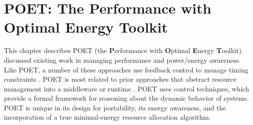 \chapter{POET: The Performance with Optimal Energy Toolkit}
\label{sec:poet}

This chapter describes POET (the \textbf{P}erformance with \textbf{O}ptimal \textbf{E}nergy \textbf{T}oolkit).
 discussed existing work in managing performance and power/energy awareness.
Like POET, a number of these approaches use feedback control to manage timing constraints \cite{Bertini2007,Fu2012,PTRADE,CoAdapt,Agilos,Li2007,TCST,Maggio13,grace2,ControlWare}.
POET is most related to prior approaches that abstract resource management into a middleware or runtime \cite{PTRADE,Rajkumar,Sojka,ControlWare}.
POET uses control techniques, which provide a formal framework for reasoning about the dynamic behavior of systems.
POET is unique in its design for portability, its energy awareness, and the incorporation of a true minimal-energy resource allocation algorithm.










